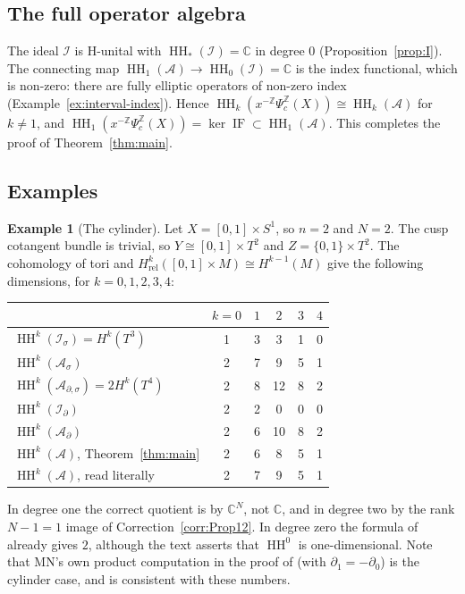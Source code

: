 \documentclass[11pt,oneside,reqno]{article}
\DeclareMathOperator{\HH}{HH}
\DeclareMathOperator{\IF}{IF}
\newcommand{\C}{\mathbb C}
\newcommand{\Z}{\mathbb Z}
\newcommand{\cA}{\mathcal A}
\newcommand{\cI}{\mathcal I}
\newcommand{\Is}{\mathcal I_\sigma}
\newcommand{\Id}{\mathcal I_\partial}
\newcommand{\As}{\mathcal A_\sigma}
\newcommand{\Ad}{\mathcal A_\partial}
\newcommand{\Ads}{\mathcal A_{\partial,\sigma}}
\newcommand{\Psic}{\Psi_{c}}
\newcommand{\Hrel}{H_{\mathrm{rel}}}
\theoremstyle{plain}
\theoremstyle{definition}
\newtheorem{example}[theorem]{Example}
\theoremstyle{remark}
\begin{document}
\subsection{The full operator algebra}
The ideal \(\cI\) is H-unital with \(\HH_*(\cI)=\C\) in degree \(0\)
(Proposition~\ref{prop:I}). The connecting map
\(\HH_1(\cA)\to\HH_0(\cI)=\C\) is the index functional, which is non-zero:
there are fully elliptic operators of non-zero index
(Example~\ref{ex:interval-index}). Hence
\(\HH_k(x^{-\Z}\Psic^{\Z}(X))\cong\HH_k(\cA)\) for \(k\ne1\), and
\(\HH_1(x^{-\Z}\Psic^{\Z}(X))=\ker\IF\subset\HH_1(\cA)\). This completes
the proof of Theorem~\ref{thm:main}.

\subsection{Examples}\label{subsec:HHexamples}

\begin{example}[The cylinder]\label{ex:cylinder}
Let \(X=[0,1]\times S^1\), so \(n=2\) and \(N=2\). The cusp cotangent
bundle is trivial, so \(Y\cong[0,1]\times T^2\) and
\(Z=\{0,1\}\times T^2\). The cohomology of tori and
\(\Hrel^k([0,1]\times M)\cong H^{k-1}(M)\) give the following dimensions,
for \(k=0,1,2,3,4\):
\begin{center}
\renewcommand{\arraystretch}{1.2}
\begin{tabular}{lccccc}
 & \(k=0\) & \(1\) & \(2\) & \(3\) & \(4\)\\\hline
 \(\HH^k(\Is)=H^k(T^3)\) & 1&3&3&1&0\\
 \(\HH^k(\As)\) & 2&7&9&5&1\\
 \(\HH^k(\Ads)=2H^k(T^4)\) & 2&8&12&8&2\\
 \(\HH^k(\Id)\) & 2&2&0&0&0\\
 \(\HH^k(\Ad)\) & 2&6&10&8&2\\
 \(\HH^k(\cA)\), Theorem~\ref{thm:main} & 2&6&8&5&1\\
 \(\HH^k(\cA)\), \cite[(16)]{MN} read literally & 2&7&9&5&1\\
\end{tabular}
\end{center}
In degree one the correct quotient is by \(\C^N\), not \(\C\), and in
degree two by the rank \(N-1=1\) image of Correction~\ref{corr:Prop12}.
In degree zero the formula of \cite[(16)]{MN} already gives \(2\),
although the text asserts that \(\HH^0\) is one-dimensional. Note that MN's own product computation in the proof of
\cite[Prop.~5]{MN} (with \(\partial_1=-\partial_0\)) is the cylinder
case, and is consistent with these numbers.
\end{example}
\end{document}
